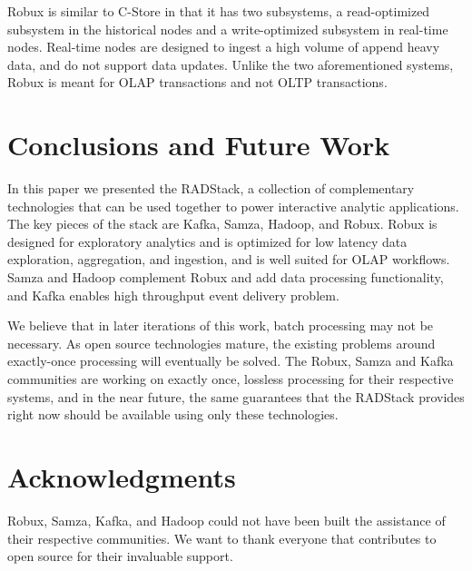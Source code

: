 \documentclass{vldb}
\begin{document}
Robux is similar to C-Store\cite{stonebraker2005c} in that it has two subsystems, a
read-optimized subsystem in the historical nodes and a write-optimized
subsystem in real-time nodes. Real-time nodes are designed to ingest a high
volume of append heavy data, and do not support data updates. Unlike the two
aforementioned systems, Robux is meant for OLAP transactions and not OLTP
transactions. 

\section{Conclusions and Future Work}
\label{sec:conclusions}
In this paper we presented the RADStack, a collection of complementary
technologies that can be used together to power interactive analytic
applications. The key pieces of the stack are Kafka, Samza, Hadoop, and Robux.
Robux is designed for exploratory analytics and is optimized for low latency
data exploration, aggregation, and ingestion, and is well suited for OLAP
workflows. Samza and Hadoop complement Robux and add data processing
functionality, and Kafka enables high throughput event delivery problem. 

We believe that in later iterations of this work, batch processing may not be
necessary. As open source technologies mature, the existing problems around
exactly-once processing will eventually be solved. The Robux, Samza and Kafka
communities are working on exactly once, lossless processing for their
respective systems, and in the near future, the same guarantees that the
RADStack provides right now should be available using only these technologies.


\balance

\section{Acknowledgments}
Robux, Samza, Kafka, and Hadoop could not have been built the assistance of
their respective communities. We want to thank everyone that contributes to
open source for their invaluable support.


\end{document}
